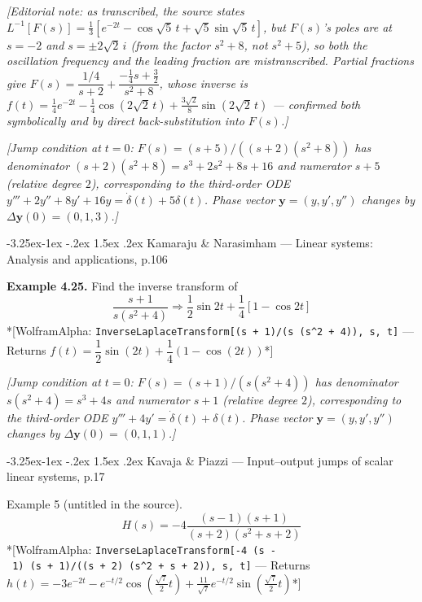 \documentclass[
  11pt,
]{article}
\makeatletter
\providecommand{\implies}{\Longrightarrow}
\renewcommand\paragraph{\@startsection{paragraph}{4}{\z@}%
                                     {-3.25ex\@plus -1ex \@minus -.2ex}%
                                     {1.5ex \@plus .2ex}%
                                     {\normalfont\normalsize\bfseries}}
\makeatother
\begin{document}
\emph{{[}Editorial note: as transcribed, the source states
\(L^{-1}[F(s)] = \frac{1}{3}\left[e^{-2t} - \cos\sqrt5\,t + \sqrt5\sin\sqrt5\,t\right]\),
but \(F(s)\)'s poles are at \(s=-2\) and \(s=\pm2\sqrt2\,i\) (from the
factor \(s^2+8\), not \(s^2+5\)), so both the oscillation frequency and
the leading fraction are mistranscribed. Partial fractions give
\(F(s)=\dfrac{1/4}{s+2}+\dfrac{-\frac14 s+\frac32}{s^2+8}\), whose
inverse is
\(f(t)=\frac14 e^{-2t}-\frac14\cos(2\sqrt2\,t)+\frac{3\sqrt2}{8}\sin(2\sqrt2\,t)\)
--- confirmed both symbolically and by direct back-substitution into
\(F(s)\).{]}}

\emph{{[}Jump condition at \(t=0\): \(F(s)=(s+5)/((s+2)(s^2+8))\) has
denominator \((s+2)(s^2+8)=s^3+2s^2+8s+16\) and numerator \(s+5\)
(relative degree \(2\)), corresponding to the third-order ODE
\(y'''+2y''+8y'+16y=\dot\delta(t)+5\delta(t)\). Phase vector
\(\mathbf y=(y,y',y'')\) changes by \(\Delta\mathbf y(0)=(0,1,3)\).{]}}

\hypertarget{kamaraju-narasimham-linear-systems-analysis-and-applications-p.106}{%
\paragraph{Kamaraju \& Narasimham --- Linear systems: Analysis and
applications,
p.106}\label{kamaraju-narasimham-linear-systems-analysis-and-applications-p.106}}

\textbf{Example 4.25.} Find the inverse transform of \[
\frac{s + 1}{s(s^2 + 4)}
\implies \frac{1}{2} \sin 2t + \frac{1}{4} [1 - \cos 2t]
\] *{[}WolframAlpha:
\texttt{InverseLaplaceTransform{[}(s\ +\ 1)/(s\ (s\^{}2\ +\ 4)),\ s,\ t{]}}
--- Returns
\(f(t) = \dfrac12\sin(2t) + \dfrac14\left(1-\cos(2t)\right)\)*{]}

\emph{{[}Jump condition at \(t=0\): \(F(s)=(s+1)/(s(s^2+4))\) has
denominator \(s(s^2+4)=s^3+4s\) and numerator \(s+1\) (relative degree
\(2\)), corresponding to the third-order ODE
\(y'''+4y'=\dot\delta(t)+\delta(t)\). Phase vector
\(\mathbf y=(y,y',y'')\) changes by \(\Delta\mathbf y(0)=(0,1,1)\).{]}}

\hypertarget{kavaja-piazzi-inputoutput-jumps-of-scalar-linear-systems-p.17}{%
\paragraph{Kavaja \& Piazzi --- Input--output jumps of scalar linear
systems,
p.17}\label{kavaja-piazzi-inputoutput-jumps-of-scalar-linear-systems-p.17}}

Example 5 (untitled in the source).
\[H(s) = -4 \frac{(s-1)(s+1)}{(s+2)(s^2+s+2)}\] *{[}WolframAlpha:
\texttt{InverseLaplaceTransform{[}-4\ (s\ -\ 1)\ (s\ +\ 1)/((s\ +\ 2)\ (s\^{}2\ +\ s\ +\ 2)),\ s,\ t{]}}
--- Returns
\(h(t) = -3e^{-2t} - e^{-t/2}\cos\!\left(\frac{\sqrt7}{2}t\right) + \frac{11}{\sqrt7}e^{-t/2}\sin\!\left(\frac{\sqrt7}{2}t\right)\)*{]}
\end{document}
